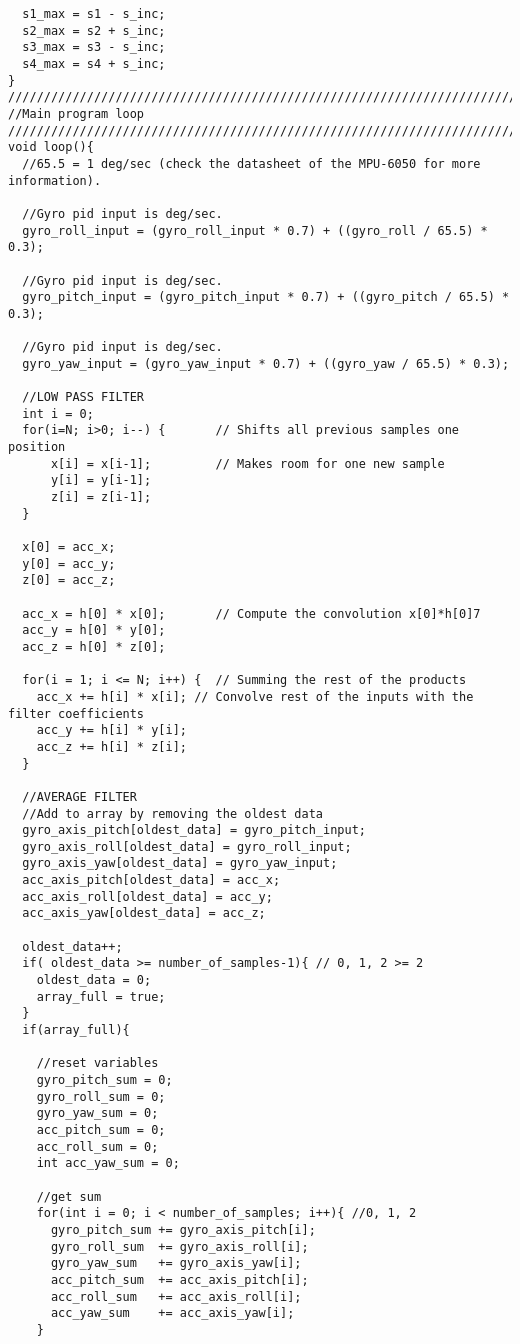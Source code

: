 \begin{lstlisting}
  s1_max = s1 - s_inc;
  s2_max = s2 + s_inc;
  s3_max = s3 - s_inc;
  s4_max = s4 + s_inc;
}
////////////////////////////////////////////////////////////////////////////////////////
//Main program loop
////////////////////////////////////////////////////////////////////////////////////////
void loop(){
  //65.5 = 1 deg/sec (check the datasheet of the MPU-6050 for more information).
  
  //Gyro pid input is deg/sec.
  gyro_roll_input = (gyro_roll_input * 0.7) + ((gyro_roll / 65.5) * 0.3);
       
  //Gyro pid input is deg/sec.
  gyro_pitch_input = (gyro_pitch_input * 0.7) + ((gyro_pitch / 65.5) * 0.3);
    
  //Gyro pid input is deg/sec.
  gyro_yaw_input = (gyro_yaw_input * 0.7) + ((gyro_yaw / 65.5) * 0.3);        
  
  //LOW PASS FILTER
  int i = 0;
  for(i=N; i>0; i--) {       // Shifts all previous samples one position
      x[i] = x[i-1];         // Makes room for one new sample
      y[i] = y[i-1];
      z[i] = z[i-1];
  }

  x[0] = acc_x;
  y[0] = acc_y;
  z[0] = acc_z;

  acc_x = h[0] * x[0];       // Compute the convolution x[0]*h[0]7
  acc_y = h[0] * y[0];
  acc_z = h[0] * z[0];
 
  for(i = 1; i <= N; i++) {  // Summing the rest of the products
    acc_x += h[i] * x[i]; // Convolve rest of the inputs with the filter coefficients
    acc_y += h[i] * y[i];
    acc_z += h[i] * z[i];
  }
  
  //AVERAGE FILTER
  //Add to array by removing the oldest data
  gyro_axis_pitch[oldest_data] = gyro_pitch_input;
  gyro_axis_roll[oldest_data] = gyro_roll_input;
  gyro_axis_yaw[oldest_data] = gyro_yaw_input;
  acc_axis_pitch[oldest_data] = acc_x;
  acc_axis_roll[oldest_data] = acc_y;
  acc_axis_yaw[oldest_data] = acc_z;
  
  oldest_data++;
  if( oldest_data >= number_of_samples-1){ // 0, 1, 2 >= 2
    oldest_data = 0;
    array_full = true;
  }
  if(array_full){
    
    //reset variables
    gyro_pitch_sum = 0;
    gyro_roll_sum = 0;
    gyro_yaw_sum = 0;
    acc_pitch_sum = 0;
    acc_roll_sum = 0;
    int acc_yaw_sum = 0;

    //get sum
    for(int i = 0; i < number_of_samples; i++){ //0, 1, 2
      gyro_pitch_sum += gyro_axis_pitch[i];
      gyro_roll_sum  += gyro_axis_roll[i];
      gyro_yaw_sum   += gyro_axis_yaw[i];
      acc_pitch_sum  += acc_axis_pitch[i];
      acc_roll_sum   += acc_axis_roll[i];
      acc_yaw_sum    += acc_axis_yaw[i];
    }
    

\end{lstlisting}
